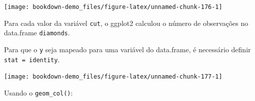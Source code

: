 \documentclass[]{book}
\newenvironment{Shaded}{\begin{snugshade}}{\end{snugshade}}
\newcommand{\KeywordTok}[1]{\textcolor[rgb]{0.13,0.29,0.53}{\textbf{#1}}}
\newcommand{\DataTypeTok}[1]{\textcolor[rgb]{0.13,0.29,0.53}{#1}}
\newcommand{\DecValTok}[1]{\textcolor[rgb]{0.00,0.00,0.81}{#1}}
\newcommand{\StringTok}[1]{\textcolor[rgb]{0.31,0.60,0.02}{#1}}
\newcommand{\OperatorTok}[1]{\textcolor[rgb]{0.81,0.36,0.00}{\textbf{#1}}}
\newcommand{\NormalTok}[1]{#1}
\begin{document}
\begin{center}\texttt{[image: bookdown-demo\_files/figure-latex/unnamed-chunk-176-1]} \end{center}

Para cada valor da variável \texttt{cut}, o ggplot2 calculou o número de
observações no data.frame \texttt{diamonds}.

Para que o \texttt{y} seja mapeado para uma variável do data.frame, é
necessário definir \texttt{stat\ =\ identity}.

\begin{Shaded}
\end{Shaded}

\begin{center}\texttt{[image: bookdown-demo\_files/figure-latex/unnamed-chunk-177-1]} \end{center}

Usando o \texttt{geom\_col()}:
\end{document}
